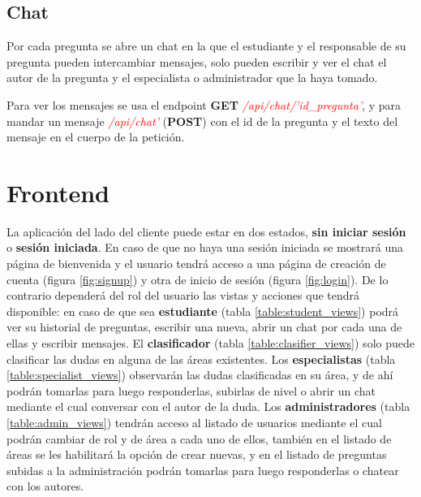 \subsection{Chat}

Por cada pregunta se abre un chat en la que el estudiante y el responsable de su pregunta pueden intercambiar mensajes, solo pueden escribir y ver el chat el autor de la pregunta y el especialista o administrador que la haya tomado.
\newline

Para ver los mensajes se usa el endpoint \textbf{GET} \textit{\textcolor{red}{/api/chat/'id\_pregunta'}}, y para mandar un mensaje \textit{\textcolor{red}{/api/chat'}} (\textbf{POST}) con el id de la pregunta y el texto del mensaje en el cuerpo de la petición.

\section{Frontend}

La aplicación del lado del cliente puede estar en dos estados, \textbf{sin iniciar sesión} o \textbf{sesión iniciada}. En caso de que no haya una sesión iniciada se mostrará una página de bienvenida y el usuario tendrá acceso a una página de creación de cuenta (figura \ref{fig:signup}) y otra de inicio de sesión (figura \ref{fig:login}). De lo contrario dependerá del rol del usuario las vistas y acciones que tendrá disponible: en caso de que sea \textbf{estudiante} (tabla \ref{table:student_views}) podrá ver su historial de preguntas, escribir una nueva, abrir un chat por cada una de ellas y escribir mensajes. El \textbf{clasificador} (tabla \ref{table:clasifier_views}) solo puede clasificar las dudas en alguna de las áreas existentes. Los \textbf{especialistas} (tabla \ref{table:specialist_views}) observarán las dudas clasificadas en su área, y de ahí podrán tomarlas para luego responderlas, subirlas de nivel o abrir un chat mediante el cual conversar con el autor de la duda. Los \textbf{administradores} (tabla \ref{table:admin_views}) tendrán acceso al listado de usuarios mediante el cual podrán cambiar de rol y de área a cada uno de ellos, también en el listado de áreas se les habilitará la opción de crear nuevas, y en el listado de preguntas subidas a la administración podrán tomarlas para luego responderlas o chatear con los autores.
\newline

